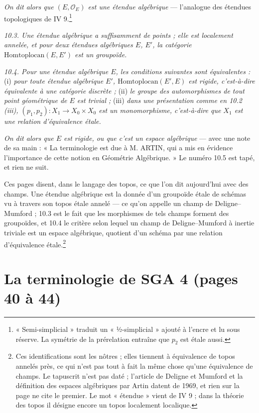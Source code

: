 \documentclass[11pt,a4paper]{article}
\begin{document}
\emph{On dit alors que $(E, \mathcal{O}_E)$ est une étendue algébrique} ---
l'analogue des étendues topologiques de IV 9.\footnote{« Semi-simplicial »
traduit un « ½-simplicial » ajouté à l'encre et lu sous réserve. La
symétrie de la prérelation entraîne que $p_2$ est étale aussi.}

\emph{10.3. Une étendue algébrique a suffisamment de points ; elle est
localement annelée, et pour deux étendues algébriques $E$, $E'$, la catégorie
$\mathrm{Homtoplocan}(E, E')$ est un groupoïde.}

\emph{10.4. Pour une étendue algébrique $E$, les conditions suivantes sont
équivalentes :} (i) \emph{pour toute étendue algébrique $E'$,
$\mathrm{Homtoplocan}(E', E)$ est rigide, c'est-à-dire équivalente à une
catégorie discrète ;} (ii) \emph{le groupe des automorphismes de tout point
géométrique de $E$ est trivial ;} (iii) \emph{dans une présentation comme en
10.2 (iii), $(p_1, p_2) : X_1 \to X_0 \times X_0$ est un monomorphisme,
c'est-à-dire que $X_1$ est une relation d'équivalence étale.}

\emph{On dit alors que $E$ est rigide, ou que c'est un espace algébrique} ---
avec une note de sa main : « La terminologie est due à M. ARTIN, qui a mis en
évidence l'importance de cette notion en Géométrie Algébrique. » Le numéro
10.5 est tapé, et rien ne suit.

Ces pages disent, dans le langage des topos, ce que l'on dit aujourd'hui avec
des champs. Une étendue algébrique est la donnée d'un groupoïde étale de
schémas vu à travers son topos étale annelé --- ce qu'on appelle un champ de
Deligne--Mumford ; 10.3 est le fait que les morphismes de tels champs forment
des groupoïdes, et 10.4 le critère selon lequel un champ de Deligne--Mumford
à inertie triviale est un espace algébrique, quotient d'un schéma par une
relation d'équivalence étale.\footnote{Ces identifications sont les nôtres ;
elles tiennent à équivalence de topos annelés près, ce qui n'est pas tout à
fait la même chose qu'une équivalence de champs. Le tapuscrit n'est pas daté ;
l'article de Deligne et Mumford et la définition des espaces algébriques par
Artin datent de 1969, et rien sur la page ne cite le premier. Le mot
« étendue » vient de IV 9 ; dans la théorie des topos il désigne encore un
topos localement localique.}

\section*{La terminologie de SGA 4 (pages 40 à 44)}
\end{document}
